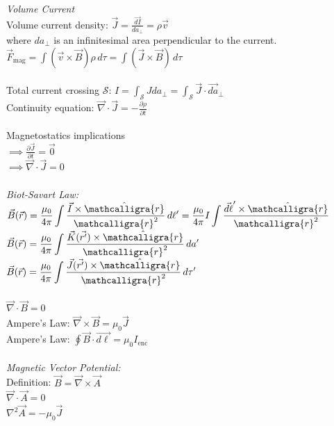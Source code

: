 \documentclass[12pt]{article}
\newcommand{\ds}{\displaystyle}
\newcommand{\scripty}[1]{\ensuremath{\mathcalligra{#1}}}
\begin{document}
\begin{flushleft}
\textit{Volume Current}\\
Volume current density: $\ds\vec{J}=\frac{\vec{dI}}{da_\perp}=\rho\vec{v}$\\
where $da_\perp$ is an infinitesimal area perpendicular to the current.\\
$\ds\vec{F}_\text{mag}=\int(\vec{v}\times\vec{B})\rho\,d\tau=\int(\vec{J}\times\vec{B})\,d\tau$\\~\\

Total current crossing $\mathcal{S}$: $\ds I=\int_\mathcal{S}Jda_\perp=\int_\mathcal{S}\vec{J}\cdot\vec{da}_\perp$\\
Continuity equation: $\ds\vec{\nabla}\cdot\vec{J}=-\frac{\partial\rho}{\partial t}$\\~\\

Magnetostatics implications\\
$\ds\implies\frac{\partial\vec{J}}{\partial t}=\vec{0}$\\
$\ds\implies\vec{\nabla}\cdot\vec{J}=0$\\~\\

\textit{Biot-Savart Law:}\\
$\ds\vec{B}(\vec{r})=\frac{\mu_0}{4\pi}\int\frac{\vec{I}\times\hat{\scripty{r}}}{\scripty{r}^2}\,d\ell'=\frac{\mu_0}{4\pi}I\int\frac{\vec{d\ell}'\times\hat{\scripty{r}}}{\scripty{r}^2}$\\
$\ds\vec{B}(\vec{r})=\frac{\mu_0}{4\pi}\int\frac{\vec{K}(\vec{r'})\times\hat{\scripty{r}}}{\scripty{r}^2}\,da'$\\
$\ds\vec{B}(\vec{r})=\frac{\mu_0}{4\pi}\int\frac{\vec{J}(\vec{r'})\times\hat{\scripty{r}}}{\scripty{r}^2}\,d\tau'$\\~\\

$\ds\vec{\nabla}\cdot\vec{B}=0$\\
Ampere's Law: $\ds\vec{\nabla}\times\vec{B}=\mu_0\vec{J}$\\
Ampere's Law: $\ds\oint\vec{B}\cdot\vec{d\ell}=\mu_0I_\text{enc}$\\~\\

\textit{Magnetic Vector Potential:}\\
Definition: $\ds\vec{B}=\vec{\nabla}\times\vec{A}$\\
$\ds\vec{\nabla}\cdot\vec{A}=0$\\
$\ds\nabla^2\vec{A}=-\mu_0\vec{J}$\\~\\


\end{flushleft}
\end{document}
